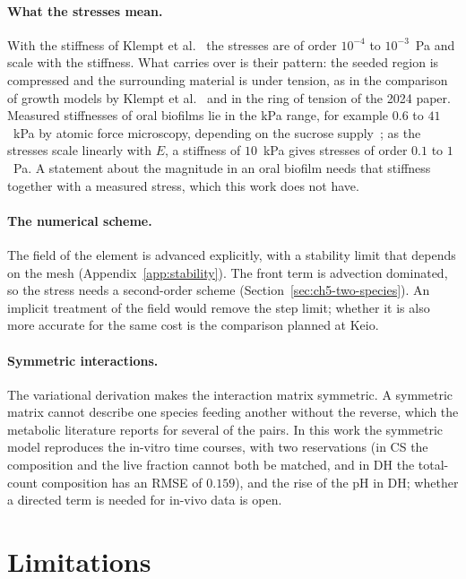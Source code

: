 \paragraph{What the stresses mean.} With the stiffness of Klempt et
al.~\cite{Klempt2024DiffusionDrivenGrowth} the stresses are of order
$10^{-4}$ to $10^{-3}$~Pa and scale with the stiffness. What carries over is their pattern:
the seeded region is compressed and the surrounding material is under tension,
as in the comparison of growth models by Klempt et
al.~\cite{Klempt2023NumericalComparison} and in the ring of tension of the 2024
paper. Measured stiffnesses of oral biofilms lie in the kPa range, for example
$0.6$ to $41$~kPa by atomic force microscopy, depending on the sucrose
supply~\cite{Pattem2018}; as the stresses scale linearly with $E$, a stiffness
of $10$~kPa gives stresses of order $0.1$ to $1$~Pa. A statement about the magnitude
in an oral biofilm needs that stiffness together with a measured stress, which
this work does not have.

\paragraph{The numerical scheme.} The field of the element is advanced explicitly, with a stability limit that
depends on the mesh (Appendix~\ref{app:stability}). The front term \fterm{} is advection dominated, so the
stress needs a second-order scheme (Section~\ref{sec:ch5-two-species}). An implicit treatment of the field would
remove the step limit; whether it is also more accurate for the same cost is the comparison planned at Keio.

\paragraph{Symmetric interactions.} The variational derivation makes the
interaction matrix symmetric. A symmetric matrix cannot describe one species
feeding another without the reverse, which the metabolic literature reports for
several of the pairs. In this work the symmetric model reproduces the
in-vitro time courses, with two reservations (in CS the composition and the live fraction cannot both be
matched, and in DH the total-count composition has an RMSE of $0.159$), and the rise of the pH in DH; whether a directed term is needed
for in-vivo data is open.

\section{Limitations}
\label{sec:concl_limitations}

